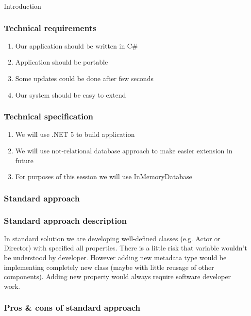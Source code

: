 \documentclass{beamer}
\begin{document}
\begin{section}{Introduction}
\begin{frame}

\end{frame}

\begin{frame}
\frametitle{Technical requirements}
\begin{enumerate}
	\item Our application should be written in C\# 
	\item Application should be portable
	\item Some updates could be done after few seconds
	\item Our system should be easy to extend
\end{enumerate}
\end{frame}

\begin{frame}
\frametitle{Technical specification}
\begin{enumerate}
	\item We will use .NET 5 to build application
	\item We will use not-relational database approach to make easier extension in future
	\item For purposes of this session we will use InMemoryDatabase
\end{enumerate}
\end{frame}

\begin{frame}
\frametitle{Standard approach \footnotemark[1]}




\end{frame}


\begin{frame}
\frametitle{Standard approach description}
In standard solution we are developing well-defined classes (e.g. Actor or Director) with specified all properties. 
There is a little risk that variable wouldn't be understood by developer. However adding new metadata type would be implementing
completely new class (maybe with little reusage of other components). Adding new property would always require software developer work.

\end{frame}

\begin{frame}
\frametitle{Pros \& cons of standard approach}


\end{frame}
\end{section}
\end{document}

